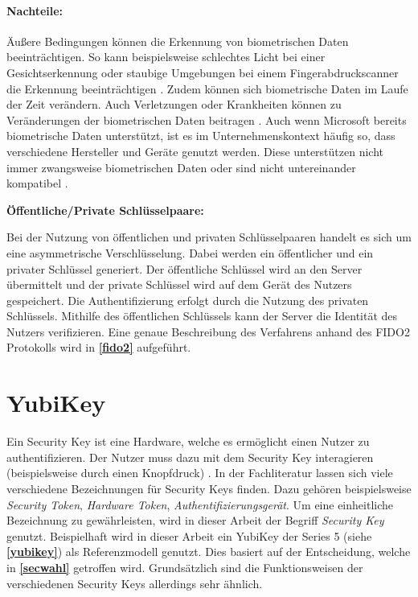\paragraph*{Nachteile:} Äußere Bedingungen können die Erkennung von biometrischen Daten beeinträchtigen. So kann beispielsweise schlechtes Licht bei einer Gesichtserkennung oder staubige Umgebungen bei einem Fingerabdruckscanner die Erkennung beeinträchtigen \cite{parmar2022comprehensive}. Zudem können sich biometrische Daten im Laufe der Zeit verändern. Auch Verletzungen oder Krankheiten können zu Veränderungen der biometrischen Daten beitragen \cite{boonkrong2012security}. Auch wenn Microsoft bereits biometrische Daten unterstützt, ist es im Unternehmenskontext häufig so, dass verschiedene Hersteller und Geräte genutzt werden. Diese unterstützen nicht immer zwangsweise biometrischen Daten oder sind nicht untereinander kompatibel \cite{parmar2022comprehensive}.

\textbf{Öffentliche/Private Schlüsselpaare:}

Bei der Nutzung von öffentlichen und privaten Schlüsselpaaren handelt es sich um eine asymmetrische Verschlüsselung. Dabei werden ein öffentlicher und ein privater Schlüssel generiert. Der öffentliche Schlüssel wird an den Server übermittelt und der private Schlüssel wird auf dem Gerät des Nutzers gespeichert. Die Authentifizierung erfolgt durch die Nutzung des privaten Schlüssels. Mithilfe des öffentlichen Schlüssels kann der Server die Identität des Nutzers verifizieren. Eine genaue Beschreibung des Verfahrens anhand des \ac{FIDO}2 Protokolls wird in \textbf{\ref{fido2}} aufgeführt.


\section{YubiKey} \label{Yubikey}
Ein Security Key ist eine Hardware, welche es ermöglicht einen Nutzer zu authentifizieren. Der Nutzer muss dazu mit dem Security Key interagieren (beispielsweise durch einen Knopfdruck) \cite{reynolds2018tale}. In der Fachliteratur lassen sich viele verschiedene Bezeichnungen für Security Keys finden. Dazu gehören beispielsweise \textit{Security Token}, \textit{Hardware Token}, \textit{Authentifizierungsgerät}. Um eine einheitliche Bezeichnung zu gewährleisten, wird in dieser Arbeit der Begriff \textit{Security Key} genutzt. Beispielhaft wird in dieser Arbeit ein YubiKey der Series 5 (siehe \textbf{\ref{yubikey}}) als Referenzmodell genutzt. Dies basiert auf der Entscheidung, welche in \textbf{\ref{secwahl}} getroffen wird. Grundsätzlich sind die Funktionsweisen der verschiedenen Security Keys allerdings sehr ähnlich.

